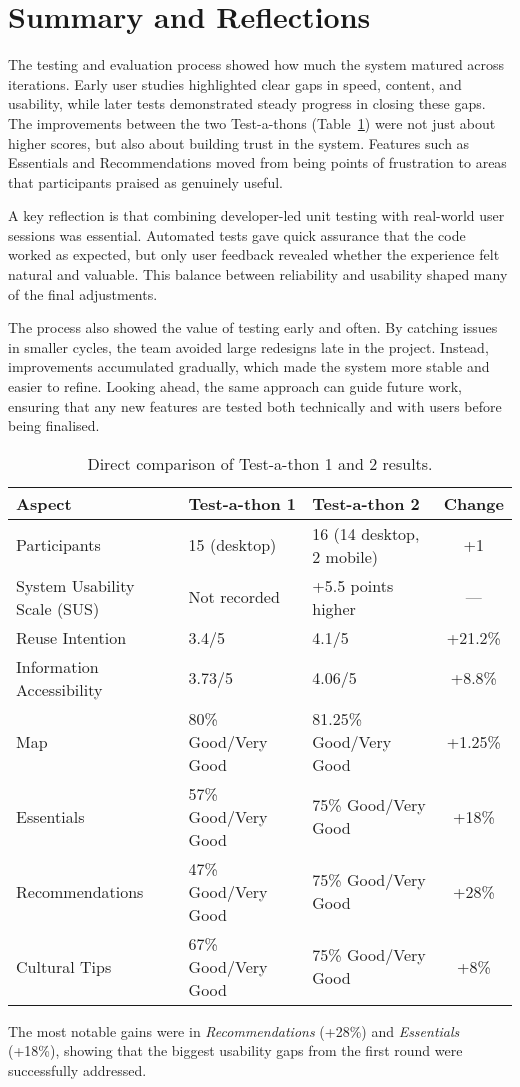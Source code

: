 \section{Summary and Reflections}

The testing and evaluation process showed how much the system matured across iterations. 
Early user studies highlighted clear gaps in speed, content, and usability, while later tests 
demonstrated steady progress in closing these gaps. The improvements between the two 
Test-a-thons (Table~\ref{tab:testathon-comparison}) were not just about higher scores, 
but also about building trust in the system. Features such as Essentials and Recommendations 
moved from being points of frustration to areas that participants praised as genuinely useful. 

A key reflection is that combining developer-led unit testing with real-world user sessions 
was essential. Automated tests gave quick assurance that the code worked as expected, 
but only user feedback revealed whether the experience felt natural and valuable. 
This balance between reliability and usability shaped many of the final adjustments. 

The process also showed the value of testing early and often. By catching issues in smaller 
cycles, the team avoided large redesigns late in the project. Instead, improvements 
accumulated gradually, which made the system more stable and easier to refine. 
Looking ahead, the same approach can guide future work, ensuring that any new 
features are tested both technically and with users before being finalised.

\begin{table}[H]
\centering
\small
\caption{Direct comparison of Test-a-thon 1 and 2 results.}
\label{tab:testathon-comparison}
\begin{tabular}{|l|p{4cm}|p{4cm}|c|}
\hline
\textbf{Aspect} & \textbf{Test-a-thon 1} & \textbf{Test-a-thon 2} & \textbf{Change} \\
\hline
Participants & 15 (desktop) & 16 (14 desktop, 2 mobile) & +1 \\
\hline
System Usability Scale (SUS) & Not recorded & +5.5 points higher & — \\
\hline
Reuse Intention & 3.4/5 & 4.1/5 & +21.2\% \\
\hline
Information Accessibility & 3.73/5 & 4.06/5 & +8.8\% \\
\hline
Map & 80\% Good/Very Good & 81.25\% Good/Very Good & +1.25\% \\
\hline
Essentials & 57\% Good/Very Good & 75\% Good/Very Good & +18\% \\
\hline
Recommendations & 47\% Good/Very Good & 75\% Good/Very Good & +28\% \\
\hline
Cultural Tips & 67\% Good/Very Good & 75\% Good/Very Good & +8\% \\
\hline
\end{tabular}
\end{table}

\noindent The most notable gains were in \textit{Recommendations} (+28\%) and \textit{Essentials} (+18\%), 
showing that the biggest usability gaps from the first round were successfully addressed.